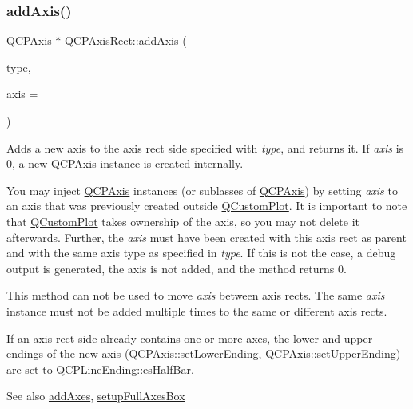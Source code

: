 \subsubsection{\texorpdfstring{add\+Axis()}{addAxis()}}
{\footnotesize\ttfamily \hyperlink{class_q_c_p_axis}{Q\+C\+P\+Axis} $\ast$ Q\+C\+P\+Axis\+Rect\+::add\+Axis (\begin{DoxyParamCaption}\item[{\hyperlink{class_q_c_p_axis_ae2bcc1728b382f10f064612b368bc18a}{Q\+C\+P\+Axis\+::\+Axis\+Type}}]{type,  }\item[{\hyperlink{class_q_c_p_axis}{Q\+C\+P\+Axis} $\ast$}]{axis = {} }\end{DoxyParamCaption})}

Adds a new axis to the axis rect side specified with {\itshape type}, and returns it. If {\itshape axis} is 0, a new \hyperlink{class_q_c_p_axis}{Q\+C\+P\+Axis} instance is created internally.

You may inject \hyperlink{class_q_c_p_axis}{Q\+C\+P\+Axis} instances (or sublasses of \hyperlink{class_q_c_p_axis}{Q\+C\+P\+Axis}) by setting {\itshape axis} to an axis that was previously created outside \hyperlink{class_q_custom_plot}{Q\+Custom\+Plot}. It is important to note that \hyperlink{class_q_custom_plot}{Q\+Custom\+Plot} takes ownership of the axis, so you may not delete it afterwards. Further, the {\itshape axis} must have been created with this axis rect as parent and with the same axis type as specified in {\itshape type}. If this is not the case, a debug output is generated, the axis is not added, and the method returns 0.

This method can not be used to move {\itshape axis} between axis rects. The same {\itshape axis} instance must not be added multiple times to the same or different axis rects.

If an axis rect side already contains one or more axes, the lower and upper endings of the new axis (\hyperlink{class_q_c_p_axis_a08af1c72db9ae4dc8cb8a973d44405ab}{Q\+C\+P\+Axis\+::set\+Lower\+Ending}, \hyperlink{class_q_c_p_axis_a69119b892fc306f651763596685aa377}{Q\+C\+P\+Axis\+::set\+Upper\+Ending}) are set to \hyperlink{class_q_c_p_line_ending_a5ef16e6876b4b74959c7261d8d4c2cd5a126c390f0c359fcd8df1fc5e38d26d5b}{Q\+C\+P\+Line\+Ending\+::es\+Half\+Bar}.

\begin{DoxySeeAlso}{See also}
\hyperlink{class_q_c_p_axis_rect_a792e1f3d9cb1591fca135bb0de9b81fc}{add\+Axes}, \hyperlink{class_q_c_p_axis_rect_a5fa906175447b14206954f77fc7f1ef4}{setup\+Full\+Axes\+Box} 
\end{DoxySeeAlso}
\hypertarget{class_q_c_p_axis_rect_a8db4722cb93e9c4a6f0d91150c200867}{}\label{class_q_c_p_axis_rect_a8db4722cb93e9c4a6f0d91150c200867} 
